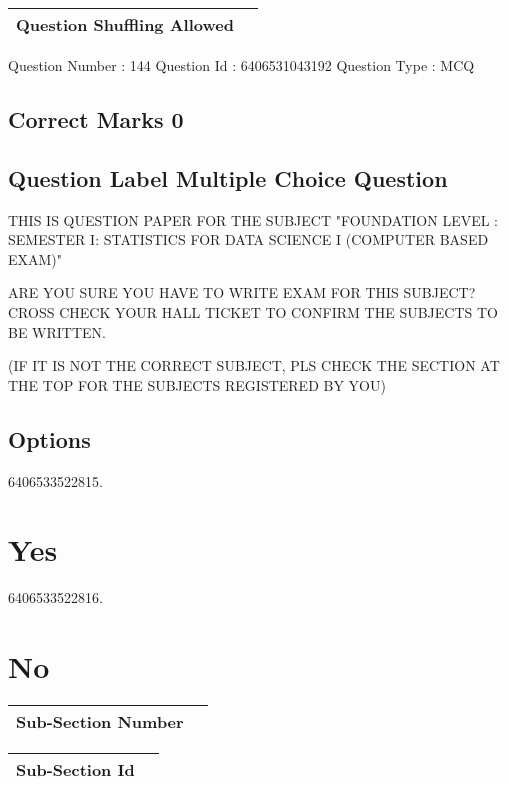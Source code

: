 \documentclass{article}
\begin{document}
\begin{longtable}{|c|c|}
\hline
\textbf{Question Shuffling Allowed} & \textbf{} \\ \hline
\end{longtable}

Question Number : 144 Question Id : 6406531043192 Question Type : MCQ\\

\subsection{Correct Marks  0}

\subsection{Question Label  Multiple Choice Question}

THIS IS QUESTION PAPER FOR THE SUBJECT "FOUNDATION LEVEL : SEMESTER I: STATISTICS 
FOR DATA SCIENCE I (COMPUTER BASED EXAM)" 
 
ARE YOU SURE YOU HAVE TO WRITE EXAM FOR THIS SUBJECT? 
CROSS CHECK YOUR HALL TICKET TO CONFIRM THE SUBJECTS TO BE WRITTEN. 
 
(IF IT IS NOT THE CORRECT SUBJECT, PLS CHECK THE SECTION AT THE TOP FOR THE SUBJECTS 
REGISTERED BY YOU)\\

\subsection{Options }

6406533522815.\\

\section{Yes}

6406533522816.\\

\section{No}

\begin{longtable}{|c|c|}
\hline
\textbf{Sub-Section Number} & \textbf{} \\ \hline
\end{longtable}

\begin{longtable}{|c|c|}
\hline
\textbf{Sub-Section Id} & \textbf{} \\ \hline
\end{longtable}
\end{document}
